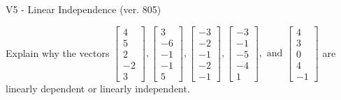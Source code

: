 \begin{exercise}
  \begin{exerciseTitle}V5 - Linear Independence (ver. 805)\end{exerciseTitle}
  \begin{exerciseStatement}
    Explain why the vectors \(\left[\begin{array}{r}
4 \\
5 \\
2 \\
-2 \\
3
\end{array}\right] , \left[\begin{array}{r}
3 \\
-6 \\
-1 \\
-1 \\
5
\end{array}\right] , \left[\begin{array}{r}
-3 \\
-2 \\
-1 \\
-2 \\
-1
\end{array}\right] , \left[\begin{array}{r}
-3 \\
-1 \\
-5 \\
-4 \\
1
\end{array}\right] , \text{ and } \left[\begin{array}{r}
4 \\
3 \\
0 \\
4 \\
-1
\end{array}\right]\) are linearly dependent or linearly independent.	



\end{exerciseStatement}
\end{exercise}

